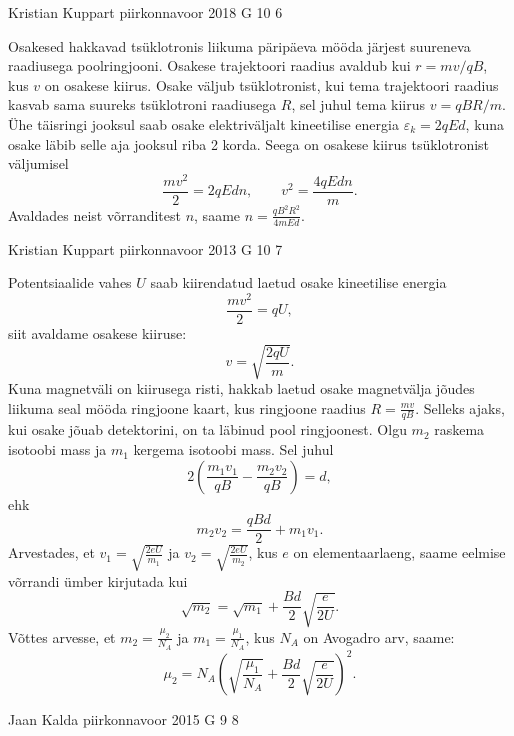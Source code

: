 \documentclass[11pt, twoside]{article}
\begin{document}
{%
{Kristian Kuppart} %
{piirkonnavoor} %
{2018} %
{G 10} %
{6} %
{

\ifSolution
Osakesed hakkavad tsüklotronis liikuma päripäeva mööda järjest suureneva raadiusega poolringjooni. Osakese trajektoori raadius avaldub kui $r=mv/qB$, kus $v$ on osakese kiirus. Osake väljub tsüklotronist, kui tema trajektoori raadius kasvab sama suureks tsüklotroni raadiusega $R$, sel juhul tema kiirus $v=qBR/m$. Ühe täisringi jooksul saab osake elektriväljalt kineetilise energia $\varepsilon_k=2qEd$, kuna osake läbib selle aja jooksul riba 2 korda. Seega on osakese kiirus tsüklotronist väljumisel
\[\frac{mv^2}{2}=2qEdn, \qquad v^2=\frac{4qEdn}{m}.\]
Avaldades neist võrranditest $n$, saame $\displaystyle n=\frac{qB^2R^2}{4mEd}$.
\fi
}

{Kristian Kuppart} %
{piirkonnavoor} %
{2013} %
{G 10} %
{7} %
{

\ifSolution
Potentsiaalide vahes $U$ saab kiirendatud laetud osake kineetilise
energia
\[
\frac{mv^{2}}{2}=qU,
\]
siit avaldame osakese kiiruse:
\[
v=\sqrt{\frac{2qU}{m}}.
\]
Kuna magnetväli on kiirusega risti, hakkab laetud osake 
magnetvälja jõudes liikuma seal mööda ringjoone kaart, kus ringjoone raadius
$R=\frac{mv}{qB}$. Selleks ajaks, kui osake jõuab detektorini,
on ta läbinud pool ringjoonest. Olgu $m_{2}$ raskema isotoobi
mass ja $m_{1}$ kergema isotoobi mass. Sel juhul 
\[ 
2\left(\frac{m_{1}v_{1}}{qB}-\frac{m_{2}v_{2}}{qB}\right)=d, 
\]
ehk
\[ 
m_{2}v_{2}=\frac{qBd}{2}+m_{1}v_{1 }.
\]
Arvestades, et $v_{1}=\sqrt{\frac{2eU}{m_{1}}}$ ja $v_{2}=\sqrt{\frac{2eU}{m_{2}}}$,
kus $e$ on elementaarlaeng, saame eelmise võrrandi ümber kirjutada kui
\[ \sqrt{m_{2}}=\sqrt{m_{1}}+\frac{Bd}{2}\sqrt{\frac{e}{2U}}. \]
Võttes arvesse, et $m_{2}=\frac{\mu_{2}}{N_{A}}$ ja $m_{1}=\frac{\mu_{1}}{N_{A}}$,
kus $N_{A}$ on Avogadro arv, saame:
\[ \mu_{2}=N_{A}\left(\sqrt{\frac{\mu_{1}}{N_{A}}}+\frac{Bd}{2}\sqrt{\frac{e}{2U}}\right)^{2}.\]
\fi
}

{Jaan Kalda} %
{piirkonnavoor} %
{2015} %
{G 9} %
{8} %
{

}}
\end{document}
